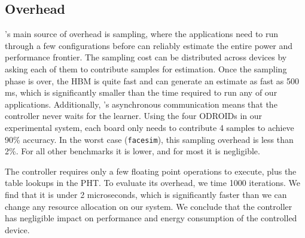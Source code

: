 
\subsection{Overhead}
\SYSTEM{}'s main source of overhead is sampling, where the
applications need to run through a few configurations before \SYSTEM{}
can reliably estimate the entire power and performance frontier. The
sampling cost can be distributed across devices by asking each of them
to contribute samples for estimation. Once the sampling phase is over,
the HBM is quite fast and can generate an estimate as fast as 500 ms,
which is significantly smaller than the time required to run any of
our applications.  Additionally, \SYSTEM{}'s asynchronous
communication means that the controller never waits for the learner.
Using the four ODROIDs in our experimental system, each board only
needs to contribute 4 samples to achieve 90\% accuracy.  In the worst
case (\texttt{facesim}), this sampling overhead is less than 2\%.  For
all other benchmarks it is lower, and for most it is negligible.

The controller requires only a few floating point operations to
execute, plus the table lookups in the PHT.  To evaluate its overhead,
we time 1000 iterations.  We find that it is under 2 microseconds,
which is significantly faster than we can change any resource
allocation on our system.  We conclude that the controller has
negligible impact on performance and energy consumption of the
controlled device.
